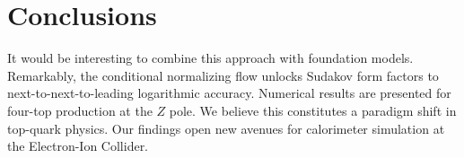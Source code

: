 \section{Conclusions}\label{sec:conclusions}

It would be interesting to combine this approach with foundation models.
Remarkably, the conditional normalizing flow unlocks Sudakov form
factors to next-to-next-to-leading logarithmic accuracy. Numerical
results are presented for four-top production at the $Z$ pole. We
believe this constitutes a paradigm shift in top-quark physics. Our
findings open new avenues for calorimeter simulation at the Electron-Ion
Collider.

